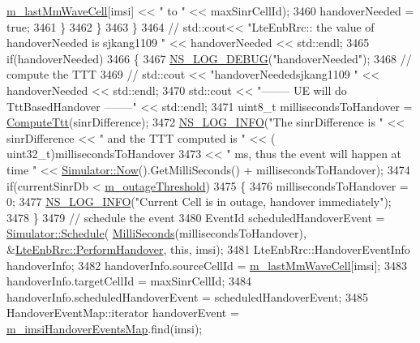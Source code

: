 \begin{DoxyCode}
      \hyperlink{classns3_1_1LteEnbRrc_a0d7b04f0383b0dc3f6a7360b87cbaeee}{m\_lastMmWaveCell}[imsi] << \textcolor{stringliteral}{" to "} << maxSinrCellId);
3460         handoverNeeded = \textcolor{keyword}{true};
3461       \}
3462     \}
3463   \}
3464  \textcolor{comment}{// std::cout<< "LteEnbRrc:: the value of handoverNeeded is sjkang1109 " << handoverNeeded << std::endl;}
3465   \textcolor{keywordflow}{if}(handoverNeeded)
3466   \{
3467     \hyperlink{group__logging_ga413f1886406d49f59a6a0a89b77b4d0a}{NS\_LOG\_DEBUG}(\textcolor{stringliteral}{"handoverNeeded"});
3468     \textcolor{comment}{// compute the TTT}
3469    \textcolor{comment}{// std::cout << "handoverNeededsjkang1109  " << handoverNeeded << std::endl;}
3470     std::cout << \textcolor{stringliteral}{"-------- UE will do TttBasedHandover --------"} << std::endl;
3471     uint8\_t millisecondsToHandover = \hyperlink{classns3_1_1LteEnbRrc_a10f21eb00cdcfe24bcbcd8cddd823029}{ComputeTtt}(sinrDifference);
3472     \hyperlink{group__logging_gafbd73ee2cf9f26b319f49086d8e860fb}{NS\_LOG\_INFO}(\textcolor{stringliteral}{"The sinrDifference is "} << sinrDifference << \textcolor{stringliteral}{" and the TTT computed is "} << (
      uint32\_t)millisecondsToHandover 
3473       << \textcolor{stringliteral}{" ms, thus the event will happen at time "} << \hyperlink{classns3_1_1Simulator_ac3178fa975b419f7875e7105be122800}{Simulator::Now}().GetMilliSeconds() + 
      millisecondsToHandover);
3474     \textcolor{keywordflow}{if}(currentSinrDb < \hyperlink{classns3_1_1LteEnbRrc_adf505b71799b8dbd81372695f14a0716}{m\_outageThreshold})
3475     \{
3476       millisecondsToHandover = 0;
3477       \hyperlink{group__logging_gafbd73ee2cf9f26b319f49086d8e860fb}{NS\_LOG\_INFO}(\textcolor{stringliteral}{"Current Cell is in outage, handover immediately"});
3478     \}
3479     \textcolor{comment}{// schedule the event}
3480     EventId scheduledHandoverEvent = \hyperlink{classns3_1_1Simulator_a671882c894a08af4a5e91181bf1eec13}{Simulator::Schedule}(
      \hyperlink{group__timecivil_gaf26127cf4571146b83a92ee18679c7a9}{MilliSeconds}(millisecondsToHandover), &\hyperlink{classns3_1_1LteEnbRrc_af70b54878c6ee756e20bc959e58b1ea0}{LteEnbRrc::PerformHandover}, \textcolor{keyword}{
      this}, imsi);
3481     LteEnbRrc::HandoverEventInfo handoverInfo;
3482     handoverInfo.sourceCellId = \hyperlink{classns3_1_1LteEnbRrc_a0d7b04f0383b0dc3f6a7360b87cbaeee}{m\_lastMmWaveCell}[imsi];
3483     handoverInfo.targetCellId = maxSinrCellId;
3484     handoverInfo.scheduledHandoverEvent = scheduledHandoverEvent;
3485     HandoverEventMap::iterator handoverEvent = \hyperlink{classns3_1_1LteEnbRrc_a6f703158e9a4ceaccbd1c5df7f5b0ba1}{m\_imsiHandoverEventsMap}.find(imsi); 

\end{DoxyCode}

